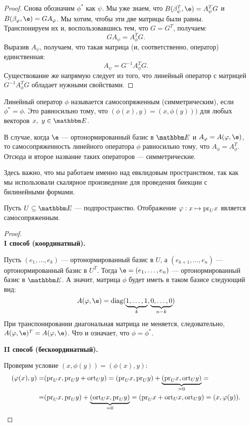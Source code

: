 \begin{proof}
Снова обозначим $\phi^*$ как $\psi$. Мы уже знаем, что $B(\beta_\psi^T, \e) = A_\psi^TG$ и $B(\beta_\phi, \e) \hm= GA_\phi$. Мы хотим, чтобы эти две матрицы были равны. Транспонируем их и, воспользовавшись тем, что $G = G^T$, получаем:
$$
GA_\psi = A_\phi^TG.
$$
Выразив $A_\psi$, получаем, что такая матрица (и, соответственно, оператор) единственная: 
$$A_\psi = G^{-1}A_\phi^TG.$$ 
Существование же напрямую следует из того, что линейный оператор с матрицей $G^{-1}A_\phi^TG$ обладает нужными свойствами.
\end{proof}

\begin{Def}
Линейный оператор $\phi$ называется самосопряженным (симметрическим), если $\phi^* = \phi$. Это равносильно тому, что $(\phi(x), y) = (x, \phi(y)))$ для любых векторов $x,\ y \in \E$.
\end{Def}

\begin{Comment}
В случае, когда $\e$ --- ортонормированный базис в $\E$ и $A_\phi = A(\phi, \e)$, то самосопряженность линейного оператора $\phi$ равносильно тому, что $A_\phi = A_\phi^T$. Отсюда и второе название таких операторов --- симметрические. 
\end{Comment}

Здесь важно, что мы работаем  именно над евклидовым пространством, так как мы использовали скалярное произведение для проведения биекции с билинейными формами.

\begin{Examples}
Пусть $U \subseteq \E$ --- подпространство. Отображение $\varphi : x \mapsto \mathrm{pr}_Ux$ является самосопряженным. 

\begin{proof}\ \\
\textbf{I способ (координатный).}

Пусть $(e_1, \ldots, e_k)$ --- ортонормированный базис в $U$, а $(e_{k+1}, \ldots, e_n)$ --- ортонормированный базис в $U^T$. Тогда $\e = (e_1, \ldots, e_n)$ --- ортонормированный базис в $\E$. А значит, матрица $\phi$ будет иметь в таком базисе следующий вид:
$$
A(\phi, \e) = \diag(\underbrace{1, \ldots, 1}_{k},\underbrace{0, \ldots, 0}_{n - k})
$$ 
При транспонировании диагональная матрица не меняется, следовательно, $A(\phi, \e)^T = A(\phi, \e)$. Что и означает, что $\phi = \phi^*$.

\textbf{II способ (бескоординатный).}

Проверим условие $(x, \phi(y)) = (\phi(x), y)$:
\begin{align*}
(\varphi(x), y) =& (\mathrm{pr}_Ux, \mathrm{pr}_Uy + \mathrm{ort}_Uy) = (\mathrm{pr}_Ux, \mathrm{pr}_Uy) + \underbrace{(\mathrm{pr}_Ux, \mathrm{ort}_Uy)}_{=0} = \\
=& (\mathrm{pr}_Ux, \mathrm{pr}_Uy) + \underbrace{(\mathrm{ort}_Ux, \mathrm{pr}_Uy)}_{=0} = (\mathrm{pr}_Ux + \mathrm{ort}_Ux, \mathrm{ort}_Uy) = (x, \varphi(y)).
\end{align*}
\end{proof}
\end{Examples}






